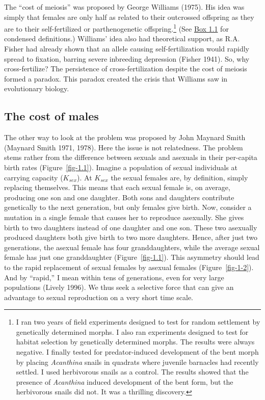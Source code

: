 \documentclass[
  letterpaper,
]{book}
\begin{document}
The ``cost of meiosis'' was proposed by George Williams (1975). His idea
was simply that females are only half as related to their outcrossed
offspring as they are to their self-fertilized or parthenogenetic
offspring.\footnote{I ran two years of field experiments designed to
  test for random settlement by genetically determined morphs. I also
  ran experiments designed to test for habitat selection by genetically
  determined morphs. The results were always negative. I finally tested
  for predator-induced development of the bent morph by placing
  \emph{Acanthina} snails in quadrats where juvenile barnacles had
  recently settled. I used herbivorous snails as a control. The results
  showed that the presence of \emph{Acanthina} induced development of
  the bent form, but the herbivorous snails did not. It was a thrilling
  discovery.} (See \protect\hyperlink{callout-1}{Box 1.1} for condensed
definitions.) Williams' idea also had theoretical support, as R.A.
Fisher had already shown that an allele causing self-fertilization would
rapidly spread to fixation, barring severe inbreeding depression (Fisher
1941). So, why cross-fertilize? The persistence of cross-fertilization
despite the cost of meiosis formed a paradox. This paradox created the
crisis that Williams saw in evolutionary biology.

\hypertarget{the-cost-of-males}{%
\subsection{The cost of males}\label{the-cost-of-males}}

The other way to look at the problem was proposed by John Maynard Smith
(Maynard Smith 1971, 1978). Here the issue is not relatedness. The
problem stems rather from the difference between sexuals and asexuals in
their per-capita birth rates (Figure~\ref{fig-1.1}). Imagine a
population of sexual individuals at carrying capacity (\(K_{sex}\)). At
\(K_{sex}\) the sexual females are, by definition, simply replacing
themselves. This means that each sexual female is, on average, producing
one son and one daughter. Both sons and daughters contribute genetically
to the next generation, but only females give birth. Now, consider a
mutation in a single female that causes her to reproduce asexually. She
gives birth to two daughters instead of one daughter and one son. These
two asexually produced daughters both give birth to two more daughters.
Hence, after just two generations, the asexual female has four
granddaughters, while the average sexual female has just one
granddaughter (Figure~\ref{fig-1.1}). This asymmetry should lead to the
rapid replacement of sexual females by asexual females
(Figure~\ref{fig-1-2}). And by ``rapid,'' I mean within tens of
generations, even for very large populations (Lively 1996). We thus seek
a selective force that can give an advantage to sexual reproduction on a
very short time scale.
\end{document}
